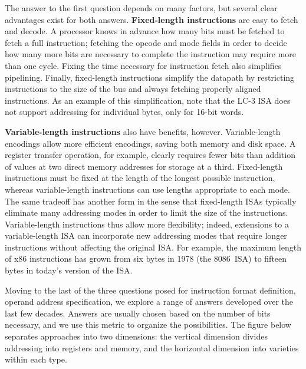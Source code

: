 The answer to the first question depends on many factors, but several
clear advantages exist for both answers.  {\bf Fixed-length
instructions} are easy to fetch and decode.  A processor knows in
advance how many bits must be fetched to fetch a full instruction;
fetching the opcode and mode fields in order to decide how many more
bits are necessary to complete the instruction may require more than
one cycle.  Fixing the time necessary for instruction fetch also
simplifies pipelining.  Finally, fixed-length instructions simplify
the datapath by restricting instructions to the size of the bus and
always fetching properly aligned instructions.  As an example of this
simplification, note that the \mbox{LC-3} ISA does not support 
addressing for individual bytes, only for \mbox{16-bit} words.

{\bf Variable-length instructions} also have benefits, however.
Variable-length encodings allow more efficient encodings, saving both
memory and disk space.  A register transfer operation, for example,
clearly requires fewer bits than addition of values at two direct
memory addresses for storage at a third.  Fixed-length instructions
must be fixed at the length of the longest possible instruction,
whereas variable-length instructions can use lengths appropriate to
each mode.  The same tradeoff has another form in the sense that
fixed-length ISAs typically eliminate many addressing modes in order
to limit the size of the instructions.  Variable-length instructions
thus allow more flexibility; indeed, extensions to a variable-length
ISA can incorporate new addressing modes that require longer
instructions without affecting the original ISA.
%
For example, the maximum length of x86 instructions has grown from six 
bytes in 1978 (the 8086~ISA) to fifteen bytes in today's version of the
ISA.

\vfill
\pagebreak

Moving to the last of the three questions posed for instruction format
definition, operand address specification,
we explore a range of answers developed over the last few
decades.  Answers are usually chosen based on the number of bits
necessary, and we use this metric to organize the possibilities.  The
figure below separates approaches into two dimensions: the vertical
dimension divides addressing into registers and memory, and the
horizontal dimension into varieties within each type.\\

\centerline{}

